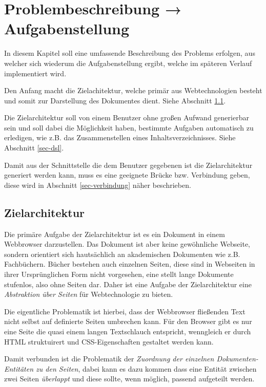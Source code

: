 \chapter{Problembeschreibung → Aufgabenstellung}

In diesem Kapitel soll eine umfassende Beschreibung des Problems erfolgen,
aus welcher sich wiederum die Aufgabenstellung ergibt, welche im
späteren Verlauf implementiert wird.

Den Anfang macht die Zielachitektur, welche primär aus Webtechnologien
besteht und somit zur Darstellung des Dokumentes dient. Siehe
Abschnitt \ref{sec-zielarchitektur}.

Die Zielarchitektur soll von einem Benutzer ohne großen Aufwand
generierbar sein und soll dabei die Möglichkeit haben, bestimmte
Aufgaben automatisch zu erledigen, wie z.B. das Zusammenstellen
eines Inhaltsverzeichnisses. Siehe Abschnitt \ref{sec-dsl}.

Damit aus der Schnittstelle die dem Benutzer gegebenen ist die Zielarchitektur
generiert werden kann, muss es eine geeignete Brücke bzw. Verbindung
geben, diese wird in Abschnitt \ref{sec-verbindung} näher beschrieben.


\section{Zielarchitektur}\label{sec-zielarchitektur}

Die primäre Aufgabe der Zielarchitektur ist es ein Dokument in
einem Webbrowser darzustellen. Das Dokument ist aber keine gewöhnliche
Webseite, sondern orientiert sich hautsächlich an akademischen
Dokumenten wie z.B. Fachbüchern. Bücher bestehen auch einzelnen Seiten,
diese sind in Webseiten in ihrer Ursprünglichen Form nicht vorgesehen,
eine stellt lange Dokumente stufenlos, also ohne Seiten dar.
Daher ist eine Aufgabe der Zielarchitektur eine \emph{Abstraktion
über Seiten} für Webtechnologie zu bieten.

Die eigentliche Problematik ist hierbei, dass der Webbrowser fließenden
Text nicht selbst auf definierte Seiten umbrechen kann. Für den Browser
gibt es nur eine Seite die quasi einem langen Textschlauch entspricht,
wenngleich er durch HTML struktuirert und
CSS-Eigenschaften gestaltet werden kann.

Damit verbunden ist die Problematik der
\emph{Zuordnung der einzelnen Dokumenten-Entitäten zu den Seiten},
dabei kann es dazu kommen dass eine Entität zwischen zwei Seiten
\emph{überlappt} und diese sollte, wenn möglich, passend aufgeteilt werden.

